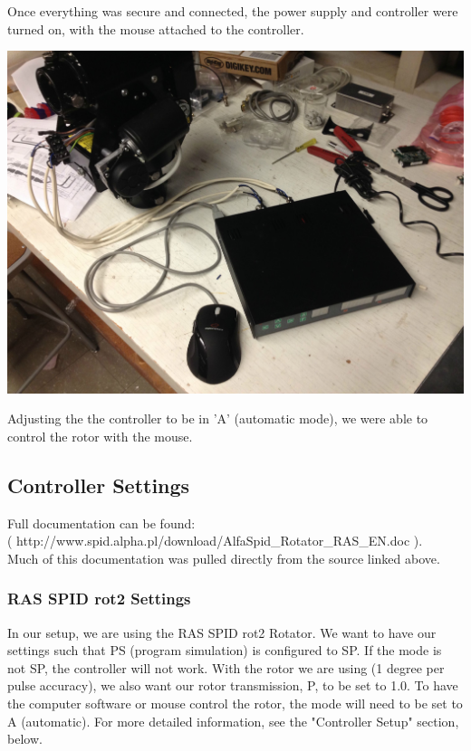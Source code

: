 \documentclass[11pt]{article} %
\begin{document}
Once everything was secure and connected, the power supply and controller were turned on, with the mouse attached to the controller.

\begin{center}
\includegraphics[scale=0.10]{wiring/10.jpeg}
\end{center}

Adjusting the the controller to be in 'A' (automatic mode), we were able to control the rotor with the mouse.








\subsection{Controller Settings}

Full documentation can be found: \\ ( http://www.spid.alpha.pl/download/AlfaSpid\_Rotator\_RAS\_EN.doc ).\\ Much of this documentation was pulled directly from the source linked above.

\subsubsection{RAS SPID rot2 Settings}

In our setup, we are using the RAS SPID rot2 Rotator. We want to have our settings such that PS (program simulation) is configured to SP. If the mode is not SP, the controller will not work. With the rotor we are using (1 degree per pulse accuracy), we also want our rotor transmission, P, to be set to 1.0. To have the computer software or mouse control the rotor, the mode will need to be set to A (automatic). For more detailed information, see the "Controller Setup" section, below.
\end{document}
